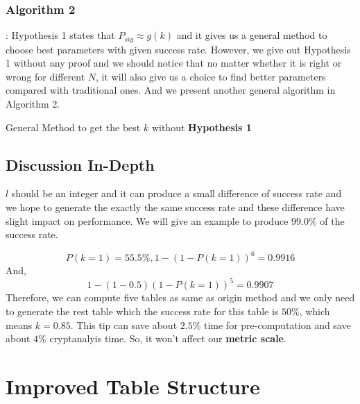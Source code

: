 \documentclass[runningheads,a4paper]{llncs}
\begin{document}
\subsubsection{Algorithm 2}: Hypothesis 1 states that $P_{sig} \approx g(k)$ and it gives us a general method to choose best parameters with given success rate. However, we give out Hypothesis 1 without any proof and we should notice that no matter whether it is right or wrong for different $N$, it will also give us a choice to find better parameters compared with traditional ones. And we present another general algorithm in Algorithm 2.


\begin{algorithm*}[!ht]
\DontPrintSemicolon
{}
\caption{General Method to get the best $k$ without \textbf{Hypothesis 1}}
\end{algorithm*}

\subsection{Discussion In-Depth}

$l$ should be an integer and it can produce a small difference of success rate and we hope to generate the exactly the same success rate and these difference have slight impact on performance. We will give an example to produce $99.0\%$  of the success rate.

$$P(k = 1) = 55.5\%, 1 - (1 - P(k = 1))^6 = 0.9916$$
And, 
$$1 - (1 - 0.5)(1 - P(k = 1))^5 = 0.9907$$
Therefore, we can compute five tables as same as origin method and we only need to generate the rest table which the success rate for this table is $50\%$, which means $k = 0.85$. This tip can save about $2.5\%$ time for pre-computation and save about $4\%$ cryptanalyis time. So, it won't affect our \textbf{metric scale}.

\section{Improved Table Structure}
\end{document}
